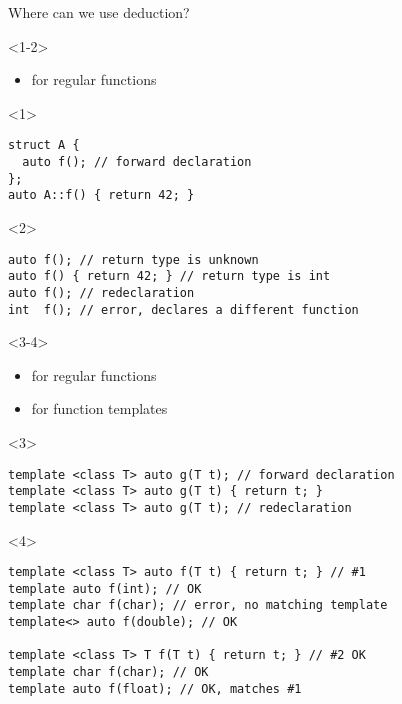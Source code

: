 \documentclass[10pt]{beamer}
\begin{document}
\begin{frame}[fragile]{Where can we use deduction?}

	\begin{onlyenv}<1-2>
		\begin{itemize}
			\item \alert{for regular functions}
		\end{itemize}

		\vfill
	\end{onlyenv}

	\begin{onlyenv}
		\begin{verbatim}
struct A {
  auto f(); // forward declaration
};
auto A::f() { return 42; }
		\end{verbatim}	
	\end{onlyenv}
	\begin{onlyenv}
	\begin{verbatim}
auto f(); // return type is unknown
auto f() { return 42; } // return type is int
auto f(); // redeclaration
int  f(); // error, declares a different function	
	\end{verbatim}

	\end{onlyenv}

	\begin{onlyenv}<3-4>
		\begin{itemize}
			\item for regular functions
			\item \alert{for function templates}
		\end{itemize}

		\vfill
	\end{onlyenv}

	\begin{onlyenv}
		\begin{verbatim}
template <class T> auto g(T t); // forward declaration
template <class T> auto g(T t) { return t; }
template <class T> auto g(T t); // redeclaration
		\end{verbatim}
	\end{onlyenv}

	\begin{onlyenv}
	\begin{verbatim}
template <class T> auto f(T t) { return t; } // #1
template auto f(int); // OK
template char f(char); // error, no matching template
template<> auto f(double); // OK

template <class T> T f(T t) { return t; } // #2 OK
template char f(char); // OK
template auto f(float); // OK, matches #1
	\end{verbatim}
	

\end{onlyenv}
\end{frame}
\end{document}
